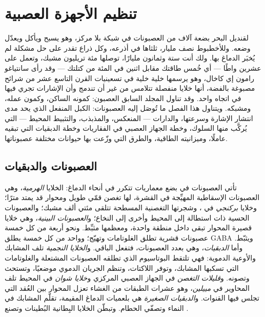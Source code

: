 \chapter{تنظيم الأجهزة العصبية}\label{ch:b3:nervous-systems}

لقنديل البحر بضعة آلاف من العصبونات في شبكة بلا مركز، وهو
يسبح ويأكل ويعدّل وضعه. وللأخطبوط نصف مليار، ثلثاها في
أذرعه، وكل ذراع تقدر على حل مشكلة لم يُخبَر الدماغ بها. ولك
أنت ستة وثمانون مليارًا، توصلها مئة تريليون مشبك، وتعمل على
عشرين واطًا --- أي خُمس طاقتك مقابل اثنين في المئة من كتلتك
--- وقد رأى سانتياغو رامون إي كاخال، وهو يرسمها خلية خلية
في تسعينيات القرن التاسع عشر من شرائح مصبوغة بالفضة، أنها
خلايا منفصلة تتلامس من غير أن تندمج وأن الإشارات تجري فيها
في اتجاه واحد. وقد تناول المجلد السابق العصبون: كمونه
الساكن، وكمون عمله، ومشبكه. ويتناول هذا الفصل ما تُوصَل
إليه العصبونات: الكبل المنفعل الذي يحد مدى انتشار الإشارة
وسرعتها، والدارات --- المنعكس، والمذبذب، والتثبيط المحيط
--- التي يُركَّب منها السلوك، وخطة الجهاز العصبي في
الفقاريات وخطة الدبقيات التي تبقيه عاملًا، وميزانيته
الطاقية، والطرق التي وزّعت بها حيوانات مختلفة عصبوناتها.

\section{العصبونات والدبقيات}

\begin{definition}\label{def:b3:nervous-systems:cells}
تأتي العصبونات في بضع معماريات تتكرر في أنحاء الدماغ:
الخلايا \emph{الهرمية}، وهي العصبونات الإسقاطية المهيِّجة في
القشرة، لها تغصن قمّي طويل ومحوار قد يمتد مترًا؛ وخلايا
\emph{بركنجي} في ، وشجرتها التغصنية المسطحة تتلقى
مئتي ألف مشبك؛ والعصبونات الحسية ذات استطالة إلى المحيط
وأخرى إلى النخاع؛ و\emph{العصبونات البينية}، وهي خلايا قصيرة
المحوار تبقى داخل منطقة واحدة، ومعظمها مثبِّط. ونحو أربعة من
كل خمسة عصبونات قشرية تطلق الغلوتامات وتهيّج؛ وواحد من كل
خمسة يطلق GABA ويثبّط. وأما \emph{الدبقيات}، وهي بعدد
العصبونات، فتفعل الباقي. و\emph{الخلايا النجمية} تلف المشابك
والأوعية الدموية: فهي تلتقط البوتاسيوم الذي تطلقه العصبونات
المشتعلة والغلوتامات التي تسكبها المشابك، وتوفر اللاكتات،
وتنظم الجريان الدموي موضعيًا، وتستحث 
وتصونه. و\emph{قليلات التغصن} في الجهاز العصبي المركزي
و\emph{خلايا شوان} في المحيط تلف المحاوير في \emph{مييلين}،
وهو عشرات الطبقات من الغشاء تعزل المحوار بين العُقد التي
تجلس فيها القنوات. و\emph{الدبقيات الصغيرة} هي بلعميات
الدماغ المقيمة، تقلّم المشابك في النماء وتصفّي الحطام.
وتبطّن الخلايا البِطانية البُطينات وتصنع .
\end{definition}

